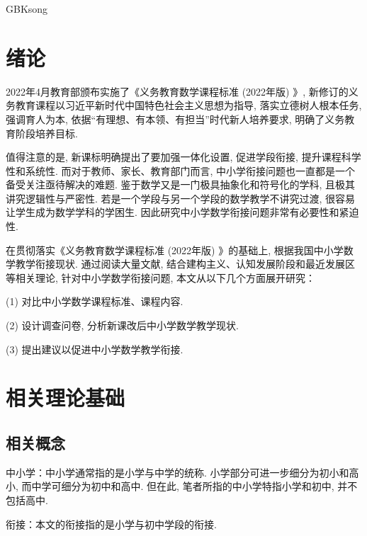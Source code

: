 \documentclass[a4paper,12pt,twoside]{ctexart}
\begin{document}
\begin{CJK*}{GBK}{song}

\newpage %
\pagestyle{empty}
\tableofcontents      %
\newpage %
\newpage
\section{绪论}
    2022年4月教育部颁布实施了《义务教育数学课程标准 (2022年版) 》, 新修订的义务教育课程以习近平新时代中国特色社会主义思想为指导, 落实立德树人根本任务, 强调育人为本, 依据“有理想、有本领、有担当”时代新人培养要求, 明确了义务教育阶段培养目标\cite{zhong}.

    值得注意的是, 新课标明确提出了要加强一体化设置, 促进学段衔接, 提升课程科学性和系统性. 而对于教师、家长、教育部门而言, 中小学衔接问题也一直都是一个备受关注亟待解决的难题. 鉴于数学又是一门极具抽象化和符号化的学科, 且极其讲究逻辑性与严密性. 若是一个学段与另一个学段的数学教学不讲究过渡, 很容易让学生成为数学学科的学困生. 因此研究中小学数学衔接问题非常有必要性和紧迫性.

    在贯彻落实《义务教育数学课程标准 (2022年版) 》的基础上, 根据我国中小学数学教学衔接现状. 通过阅读大量文献, 结合建构主义、认知发展阶段和最近发展区等相关理论, 针对中小学数学衔接问题, 本文从以下几个方面展开研究：

 (1) 	对比中小学数学课程标准、课程内容.

 (2) 	设计调查问卷, 分析新课改后中小学数学教学现状.

 (3) 	提出建议以促进中小学数学教学衔接.
\section{相关理论基础}
\subsection{相关概念}
中小学：中小学通常指的是小学与中学的统称. 小学部分可进一步细分为初小和高小, 而中学可细分为初中和高中. 但在此, 笔者所指的中小学特指小学和初中, 并不包括高中.

衔接：本文的衔接指的是小学与初中学段的衔接.

\end{CJK*}
\end{document}
